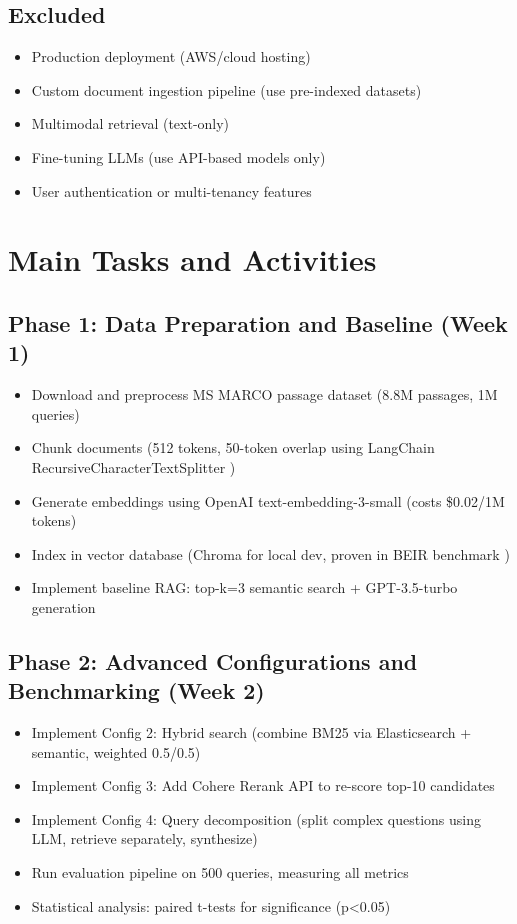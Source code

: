 \documentclass[11pt,a4paper]{article}
\begin{document}
\subsection{Excluded}
\begin{itemize}[leftmargin=*]
    \item Production deployment (AWS/cloud hosting)
    \item Custom document ingestion pipeline (use pre-indexed datasets)
    \item Multimodal retrieval (text-only)
    \item Fine-tuning LLMs (use API-based models only)
    \item User authentication or multi-tenancy features
\end{itemize}

\section{Main Tasks and Activities}

\subsection{Phase 1: Data Preparation and Baseline (Week 1)}
\begin{itemize}[leftmargin=*,nosep]
    \item Download and preprocess MS MARCO passage dataset (8.8M passages, 1M queries)
    \item Chunk documents (512 tokens, 50-token overlap using LangChain RecursiveCharacterTextSplitter \cite{langchain2024})
    \item Generate embeddings using OpenAI text-embedding-3-small (costs \$0.02/1M tokens)
    \item Index in vector database (Chroma for local dev, proven in BEIR benchmark \cite{thakur2021beir})
    \item Implement baseline RAG: top-k=3 semantic search + GPT-3.5-turbo generation
\end{itemize}

\subsection{Phase 2: Advanced Configurations and Benchmarking (Week 2)}
\begin{itemize}[leftmargin=*,nosep]
    \item Implement Config 2: Hybrid search (combine BM25 via Elasticsearch + semantic, weighted 0.5/0.5)
    \item Implement Config 3: Add Cohere Rerank API to re-score top-10 candidates
    \item Implement Config 4: Query decomposition (split complex questions using LLM, retrieve separately, synthesize)
    \item Run evaluation pipeline on 500 queries, measuring all metrics
    \item Statistical analysis: paired t-tests for significance (p<0.05)
\end{itemize}
\end{document}

